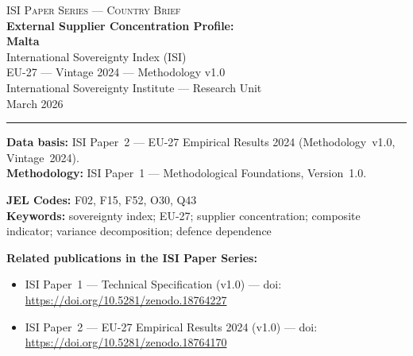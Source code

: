 \documentclass[12pt,a4paper]{article}
\begin{document}
\hypersetup{pageanchor=false}

\begin{titlepage}
\centering
\vspace*{2cm}
{\Large\textsc{ISI Paper Series --- Country Brief}}\\[1.2cm]
{\LARGE\bfseries External Supplier Concentration Profile:\\[0.3em]
Malta}\\[1.5cm]
{\large International Sovereignty Index (ISI)\\[0.3em]
EU-27 --- Vintage 2024 --- Methodology v1.0}\\[1.2cm]
{\large International Sovereignty Institute --- Research Unit}\\[0.8cm]
{\large March 2026}

\vspace{0.8cm}
\noindent\rule{\textwidth}{0.4pt}
\vspace{0.4cm}

\begin{flushleft}
\noindent\textbf{Data basis:} ISI Paper~2 --- EU-27 Empirical Results 2024 (Methodology~v1.0, Vintage~2024).\\[4pt]
\noindent\textbf{Methodology:} ISI Paper~1 --- Methodological Foundations, Version~1.0.

\medskip

\noindent\textbf{JEL Codes:} F02, F15, F52, O30, Q43\\[4pt]
\noindent\textbf{Keywords:} sovereignty index; EU-27; supplier concentration; composite indicator; variance decomposition; defence dependence

\medskip

\noindent\textbf{Related publications in the ISI Paper Series:}
\begin{itemize}[nosep,leftmargin=1.5em]
\item ISI Paper~1 --- Technical Specification (v1.0) --- doi:\\
  \url{https://doi.org/10.5281/zenodo.18764227}
\item ISI Paper~2 --- EU-27 Empirical Results 2024 (v1.0) --- doi:\\
  \url{https://doi.org/10.5281/zenodo.18764170}
\end{itemize}
\end{flushleft}
\vfill
\end{titlepage}
\end{document}
